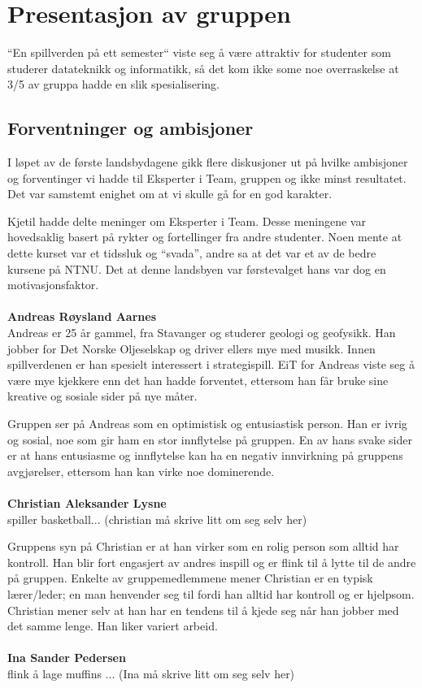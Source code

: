 \section{Presentasjon av gruppen}
``En spillverden på ett semester`` viste seg å være attraktiv for
studenter som studerer datateknikk og informatikk, så det kom ikke some
noe overraskelse at 3/5 av gruppa hadde en slik spesialisering.

\subsection{Forventninger og ambisjoner}
I løpet av de første landsbydagene gikk flere diskusjoner ut på hvilke
ambisjoner og forventinger vi hadde til Eksperter i Team, gruppen og
ikke minst resultatet. Det var samstemt enighet om at vi skulle gå for
en god karakter.

Kjetil hadde delte meninger om Eksperter i Team. Desse meningene var
hovedsaklig basert på rykter og fortellinger fra andre studenter. Noen
mente at dette kurset var et tidssluk og ``svada'', andre sa at det var
et av de bedre kursene på NTNU. Det at denne landsbyen var førstevalget
hans var dog en motivasjonsfaktor.
\\
\\
\textbf{Andreas Røysland Aarnes}\\
Andreas er 25 år gammel, fra Stavanger og studerer geologi og geofysikk. Han jobber for Det Norske Oljeselskap og driver ellers mye med musikk. Innen spillverdenen er han spesielt interessert i strategispill. EiT for Andreas viste seg å være mye kjekkere enn det han hadde forventet, ettersom han får bruke sine kreative og sosiale sider på nye måter. 

Gruppen ser på Andreas som en optimistisk og entusiastisk person. Han er
ivrig og sosial, noe som gir ham en stor innflytelse på gruppen. En av
hans svake sider er at hans entusiasme og innflytelse kan ha en negativ
innvirkning på gruppens avgjørelser, ettersom han kan virke noe
dominerende. \\\\
\textbf{Christian Aleksander Lysne}\\
spiller basketball... (christian må skrive litt om seg selv her)

Gruppens syn på Christian er at han virker som en rolig person som
alltid har kontroll. Han blir fort engasjert av andres inspill og er
flink til å lytte til de andre på gruppen. Enkelte av gruppemedlemmene
mener Christian er en typisk lærer/leder; en man henvender seg til fordi
han alltid har kontroll og er hjelpsom. Christian mener selv at han har
en tendens til å kjede seg når han jobber med det samme lenge. Han liker
variert arbeid. \\\\
\textbf{Ina Sander Pedersen}\\
flink å lage muffins ... (Ina må skrive litt om seg selv her)

